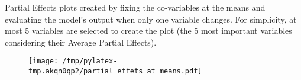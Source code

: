 \documentclass{article}%
\begin{document}
                Partial Effects plots created by fixing the co-variables at
                the means and evaluating the model's output when only one
                variable changes. For simplicity, at most 5 variables are
                selected to create the plot (the 5 most important variables
                considering their Average Partial Effects).

                \vfill%


\begin{figure}[H]%
\centering%
\texttt{[image: /tmp/pylatex-tmp.akqn0qp2/partial\_effets\_at\_means.pdf]}%
\end{figure}

%
\vfill \pagebreak

%
\end{document}
